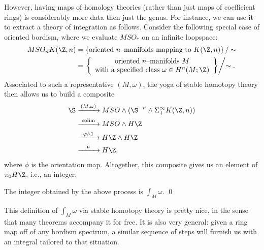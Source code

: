 However, having maps of homology theories (rather than just maps of coefficient rings) is considerably more data then just the genus.  For instance, we can use it to extract a theory of integration as follows.  Consider the following special case of oriented bordism, where we evaluate $MSO_*$ on an infinite loopspace:
\begin{align*}
MSO_n K(\Z, n) & = \left\{ \text{oriented $n$--manifolds mapping to $K(\Z, n)$} \right\} / \sim \\
& = \left. \left\{ \begin{array}{c}\text{oriented $n$--manifolds $M$} \\ \text{with a specified class $\omega \in H^n(M; \Z)$} \end{array}\right\} \middle/ \sim \right. .
\end{align*}
Associated to such a representative $(M, \omega)$, the yoga of stable homotopy theory then allows us to build a composite
\begin{align*}
\S & \xrightarrow{\mathmakebox[2.5em]{(M, \omega)}} MSO \sm (\S^{-n} \sm \Susp^\infty_+ K(\Z, n)) \\ 
& \xrightarrow{\mathmakebox[2.5em]{\colim}} MSO \sm H\Z \\
& \xrightarrow{\mathmakebox[2.5em]{\phi \sm 1}} H\Z \sm H\Z \\
& \xrightarrow{\mathmakebox[2.5em]{\mu}} H\Z,
\end{align*}
where $\phi$ is the orientation map.  Altogether, this composite gives us an element of $\pi_0 H\Z$, i.e., an integer.

\begin{lemma}
The integer obtained by the above process is $\int_M \omega$. \qed
\end{lemma}

\noindent This definition of $\int_M \omega$ via stable homotopy theory is pretty nice, in the sense that many theorems accompany it for free.  It is also very general: given a ring map off of any bordism spectrum, a similar sequence of steps will furnish us with an integral tailored to that situation.

